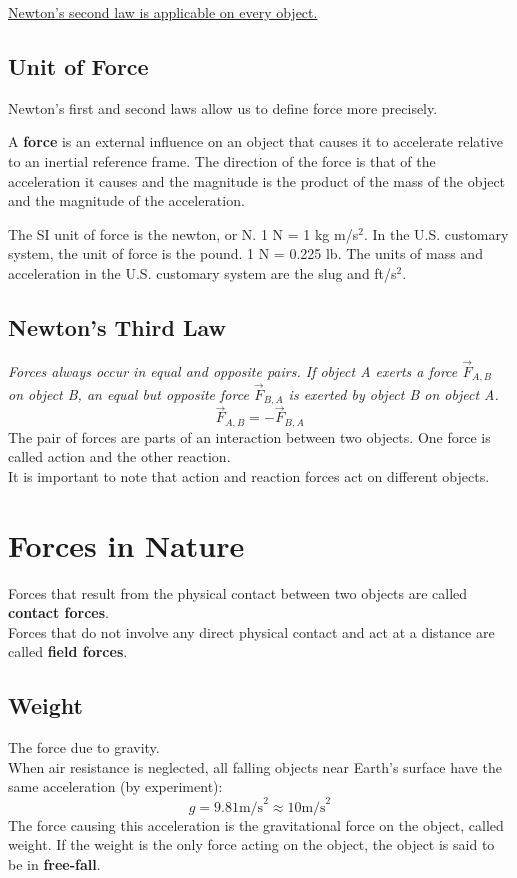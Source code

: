 \documentclass[11pt,letter]{report}
\begin{document}
\noindent
\underline{Newton's second law is applicable on every object.}

\subsection{Unit of Force}
Newton's first and second laws allow us to define force more precisely.

\hspace{1mm}

\noindent
A \textbf{force} is an external influence on an object that causes it to accelerate relative to an inertial reference frame. The direction of the force is that of the acceleration it causes and the magnitude is the product of the mass of the object and the magnitude of the acceleration.

\hspace{1mm}

\noindent
The SI unit of force is the newton, or N. 1 N = 1 kg m/s$^2$. In the U.S. customary system, the unit of force is the pound. 1 N = 0.225 lb. The units of mass and acceleration in the U.S. customary system are the slug and ft/s$^2$.

\subsection{Newton's Third Law}
\emph{Forces always occur in equal and opposite pairs. If object A exerts a force $\vec{F}_{A, B}$ on object B, an equal but opposite force $\vec{F}_{B, A}$ is exerted by object B on object A.} $$\vec{F}_{A, B} = -\vec{F}_{B, A}$$
The pair of forces are parts of an interaction between two objects. One force is called action and the other reaction.
\\It is important to note that action and reaction forces act on different objects.

\section{Forces in Nature}
Forces that result from the physical contact between two objects are called \textbf{contact forces}.
\\Forces that do not involve any direct physical contact and act at a distance are called \textbf{field forces}.

\subsection{Weight}The force due to gravity.
\\When air resistance is neglected, all falling objects near Earth's surface have the same acceleration (by experiment): $$g=9.81 \mathrm{ m/s} ^2 \approx 10 \mathrm{ m/s} ^2$$
The force causing this acceleration is the gravitational force on the object, called weight. If the weight is the only force acting on the object, the object is said to be in \textbf{free-fall}.
\end{document}
